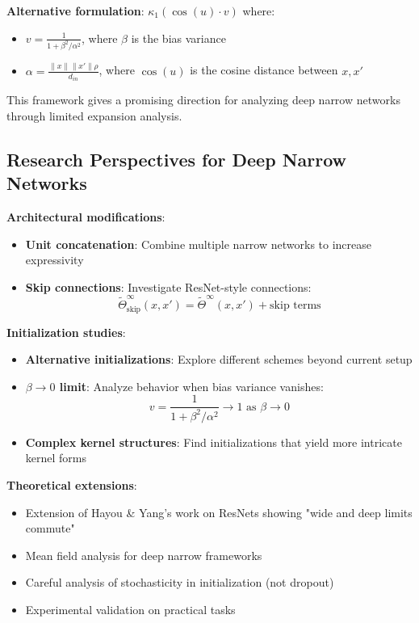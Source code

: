 \textbf{Alternative formulation}: $\kappa_1(\cos(u) \cdot v)$ where:
\begin{itemize}
\item $v = \frac{1}{1 + \beta^2/\alpha^2}$, where $\beta$ is the bias variance
\item $\alpha = \frac{\|x\| \|x'\| \rho}{d_{in}}$, where $\cos(u)$ is the cosine distance between $x, x'$
\end{itemize}

This framework gives a promising direction for analyzing deep narrow networks through limited expansion analysis.

\subsection{Research Perspectives for Deep Narrow Networks}

\textbf{Architectural modifications}:
\begin{itemize}
\item \textbf{Unit concatenation}: Combine multiple narrow networks to increase expressivity
\item \textbf{Skip connections}: Investigate ResNet-style connections:
  \[ \tilde{\Theta}^\infty_{\text{skip}}(x, x') = \tilde{\Theta}^\infty(x, x') + \text{skip terms} \]
\end{itemize}

\textbf{Initialization studies}:
\begin{itemize}
\item \textbf{Alternative initializations}: Explore different schemes beyond current setup
\item \textbf{$\beta \to 0$ limit}: Analyze behavior when bias variance vanishes:
  \[ v = \frac{1}{1 + \beta^2/\alpha^2} \to 1 \text{ as } \beta \to 0 \]
\item \textbf{Complex kernel structures}: Find initializations that yield more intricate kernel forms
\end{itemize}

\begin{tcolorbox}[colback=green!5,colframe=green!80!black,title={\textbf{Remark: Theoretical Extensions}},enhanced,drop shadow,boxrule=2pt]
\textbf{Theoretical extensions}:
\begin{itemize}
\item Extension of Hayou \& Yang's work on ResNets showing "wide and deep limits commute"
\item Mean field analysis for deep narrow frameworks
\item Careful analysis of stochasticity in initialization (not dropout)
\item Experimental validation on practical tasks
\end{itemize}
\end{tcolorbox}





